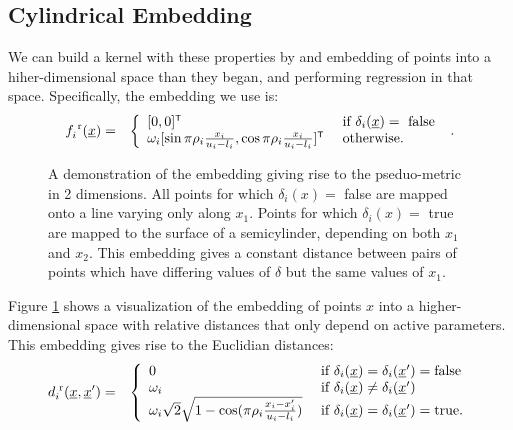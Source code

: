 \documentclass{article}
\newcommand{\vect}[1]{\underline{\smash{#1}}}
\renewcommand{\v}[1]{\vect{#1}}
\newcommand{\reals}{\mathds{R}}
\newcommand{\sX}{\mathcal{X}}
\newcommand{\br}{^{\text{\textnormal{ r}}}}
\newcommand\transpose{{\textrm{\tiny{\sf{T}}}}}
\begin{document}
\subsection{Cylindrical Embedding}

We can build a kernel with these properties by and embedding of points into a hiher-dimensional space than they began, and performing regression in that space.  Specifically, the embedding we use is:
%
%
%
\begin{eqnarray}
\nonumber{}f_i\br(\v{x}) & = & \left\{\begin{array}{ll}
[0,0]^\transpose & \textrm{ if } \delta_i(\v{x}) = \textrm{ false }\\
\nonumber{} \omega_i [\sin{\pi\rho_i\frac{x_i}{u_i-l_i}}, \cos{\pi\rho_i\frac{x_i}{u_i-l_i}}]^\transpose & \textrm{ otherwise.}\end{array}\right..
\end{eqnarray}
%
\begin{figure}

\caption{A demonstration of the embedding giving rise to the pseduo-metric in 2 dimensions.  All points for which $\delta_i(x) =$ false are mapped onto a line varying only along $x_1$.  Points for which $\delta_i(x) =$ true are mapped to the surface of a semicylinder, depending on both $x_1$ and $x_2$.  This embedding gives a constant distance between pairs of points which have differing values of $\delta$ but the same values of $x_1$.
}
\label{fig:cylinder}
\end{figure}
%
Figure \ref{fig:cylinder} shows a visualization of the embedding of points $x$ into a higher-dimensional space with relative distances that only depend on active parameters.
%
This embedding gives rise to the Euclidian distances:
%
\begin{eqnarray}
\nonumber{}d\br_i(\v{x}, \v{x}') & = & \left\{\begin{array}{ll}
\nonumber{} 0 & \textrm{ if } \delta_i(\v{x}) = \delta_i(\v{x}') = \textrm{false}\\
\nonumber{} \omega_i & \textrm{ if } \delta_i(\v{x}) \neq \delta_i(\v{x}')\\
\nonumber{} \omega_i \sqrt{2} \sqrt{1 - \cos(\pi\rho_i \frac{x_i-x_i'}{u_i-l_i})} & \textrm{ if } \delta_i(\v{x}) = \delta_i(\v{x}') = \textrm{true}. \end{array}\right.
\end{eqnarray}
\end{document}
